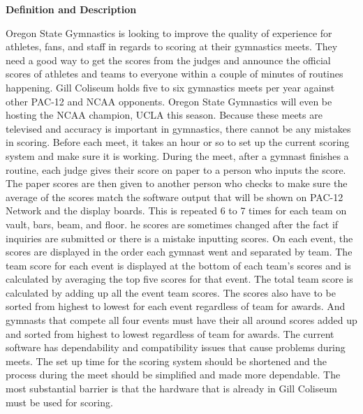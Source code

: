 \documentclass[letterpaper,10pt,draftclsnofoot,onecolumn,]{IEEEtran}
\begin{document}
\begin{center}
\textbf{Definition and Description}\\
\end{center}
Oregon State Gymnastics is looking to improve the quality of experience for athletes, fans, and staff in regards to scoring at their gymnastics meets. They need a good way to get the scores from the judges and announce the official scores of athletes and teams to everyone within a couple of minutes of routines happening. Gill Coliseum holds five to six gymnastics meets per year against other PAC-12 and NCAA opponents. Oregon State Gymnastics will even be hosting the NCAA champion, UCLA this season. Because these meets are televised and accuracy is important in gymnastics, there cannot be any mistakes in scoring. Before each meet, it takes an hour or so to set up the current scoring system and make sure it is working. During the meet, after a gymnast finishes a routine, each judge gives their score on paper to a person who inputs the score. The paper scores are then given to another person who checks to make sure the average of the scores match the software output that will be shown on PAC-12 Network and the display boards. This is repeated 6 to 7 times for each team on vault, bars, beam, and floor. he scores are sometimes changed after the fact if inquiries are submitted or there is a mistake inputting scores. On each event, the scores are displayed in the order each gymnast went and separated by team. The team score for each event is displayed at the bottom of each team's scores and is calculated by averaging the top five scores for that event. The total team score is calculated by adding up all the event team scores. The scores also have to be sorted from highest to lowest for each event regardless of team for awards. And gymnasts that compete all four events must have their all around scores added up and sorted from highest to lowest regardless of team for awards. The current software has dependability and compatibility issues that cause problems during meets. The set up time for the scoring system should be shortened and the process during the meet should be simplified and made more dependable. The most substantial barrier is that the hardware that is already in Gill Coliseum must be used for scoring.\\
\end{document}
